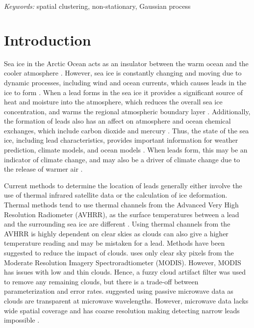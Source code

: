 \documentclass[12pt]{article}
\begin{document}
\noindent%
{\it Keywords:} spatial clustering, non-stationary, Gaussian process
\vfill

\newpage
{} %

\hypertarget{intro}{%
\section{Introduction}\label{intro}}

Sea ice in the Arctic Ocean acts as an insulator between the warm ocean
and the cooler atmosphere \citep{peterson_evaluating_2011}. However, sea
ice is constantly changing and moving due to dynamic processes,
including wind and ocean currents, which causes leads in the ice to form
\citep{peterson_evaluating_2011, hoffman_detection_2019, hutter_leads_2019}.
When a lead forms in the sea ice it provides a significant source of
heat and moisture into the atmosphere, which reduces the overall sea ice
concentration, and warms the regional atmospheric boundary layer
\citep[\citet{reiser_new_2020}]{key_detectability_1993}. Additionally,
the formation of leads also has an affect on atmosphere and ocean
chemical exchanges, which include carbon dioxide and mercury
\citep{hoffman_detection_2019}. Thus, the state of the sea ice,
including lead characteristics, provides important information for
weather prediction, climate models, and ocean models
\citep{reiser_new_2020}. When leads form, this may be an indicator of
climate change, and may also be a driver of climate change due to the
release of warmer air \citep{peterson_evaluating_2011}.

Current methods to determine the location of leads generally either
involve the use of thermal infrared satellite data or the calculation of
ice deformation. Thermal methods tend to use thermal channels from the
Advanced Very High Resolution Radiometer (AVHRR), as the surface
temperatures between a lead and the surrounding sea ice are different
\citep{key_detectability_1993}. Using thermal channels from the AVHRR is
highly dependent on clear skies as clouds can also give a higher
temperature reading and may be mistaken for a lead. Methods have been
suggested to reduce the impact of clouds.
\citet{willmes_pan-arctic_2015} uses only clear sky pixels from the
Moderate Resolution Imagery Spectroradtiometer (MODIS). However, MODIS
has issues with low and thin clouds. Hence, a fuzzy cloud artifact
filter was used to remove any remaining clouds, but there is a trade-off
between parameterization and error rates. \citet{rohrs_algorithm_2012}
suggested using passive microwave data as clouds are transparent at
microwave wavelengths. However, microwave data lacks wide spatial
coverage and has coarse resolution making detecting narrow leads
impossible \citep{hoffman_detection_2019}.
\end{document}
